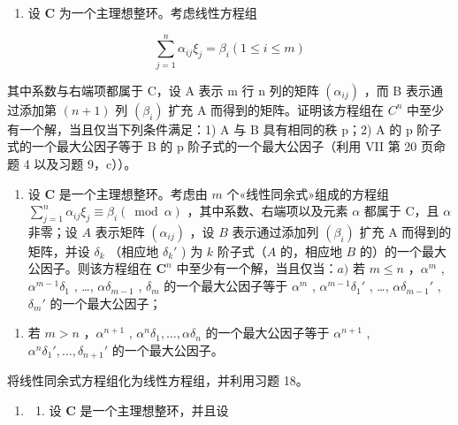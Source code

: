 \begin{enumerate}
\def\labelenumi{\arabic{enumi})}
\setcounter{enumi}{17}
\tightlist
\item
  设 \(\mathbf{C}\) 为一个主理想整环。考虑线性方程组
\end{enumerate}

\[
\sum_ {j = 1} ^ {n} \alpha_ {i j} \xi_ {j} = \beta_ {i} (1 \leqslant i \leqslant m)
\]

其中系数与右端项都属于 C，设 A 表示 m 行 n 列的矩阵 \((\alpha_{ij})\) ，而 B 表示通过添加第 \((n+1)\) 列 \((\beta_{i})\) 扩充 A 而得到的矩阵。证明该方程组在 \(C^{n}\) 中至少有一个解，当且仅当下列条件满足：1) A 与 B 具有相同的秩 p；2) A 的 p 阶子式的一个最大公因子等于 B 的 p 阶子式的一个最大公因子（利用 VII 第 20 页命题 4 以及习题 9，c））。

\begin{enumerate}
\def\labelenumi{\arabic{enumi})}
\setcounter{enumi}{18}
\tightlist
\item
  设 \(\mathbf{C}\) 是一个主理想整环。考虑由 \(m\) 个«线性同余式»组成的方程组 \(\sum_{j=1}^{n} \alpha_{ij} \xi_j \equiv \beta_i (\bmod \alpha)\) ，其中系数、右端项以及元素 \(\alpha\) 都属于 C，且 \(\alpha\) 非零；设 \(A\) 表示矩阵 \((\alpha_{ij})\) ，设 \(B\) 表示通过添加列 \((\beta_i)\) 扩充 A 而得到的矩阵，并设 \(\delta_k\) （相应地 \(\delta_k'\) ) 为 \(k\) 阶子式（\(A\) 的，相应地 \(B\) 的）的一个最大公因子。则该方程组在 \(\mathbf{C}^n\) 中至少有一个解，当且仅当：\(a)\) 若 \(m \leqslant n\) ，\(\alpha^m\) , \(\alpha^{m-1}\delta_1\) , \ldots, \(\alpha\delta_{m-1}\) , \(\delta_m\) 的一个最大公因子等于 \(\alpha^m\) , \(\alpha^{m-1}\delta_1'\) , \ldots, \(\alpha\delta_{m-1}'\) , \(\delta_m'\) 的一个最大公因子；
\end{enumerate}

\begin{enumerate}
\def\labelenumi{\alph{enumi})}
\setcounter{enumi}{1}
\tightlist
\item
  若 \(m > n\) ，\(\alpha^{n+1}\) , \(\alpha^n \delta_1, \ldots, \alpha \delta_n\) 的一个最大公因子等于 \(\alpha^{n+1}\) , \(\alpha^n \delta_1', \ldots, \delta_{n+1}'\) 的一个最大公因子。
\end{enumerate}

将线性同余式方程组化为线性方程组，并利用习题 18。

\begin{enumerate}
\def\labelenumi{\arabic{enumi})}
\setcounter{enumi}{19}
\tightlist
\item
  \begin{enumerate}
  \def\labelenumii{\alph{enumii})}
  \tightlist
  \item
    设 \(\mathbf{C}\) 是一个主理想整环，并且设
  \end{enumerate}
\end{enumerate}

